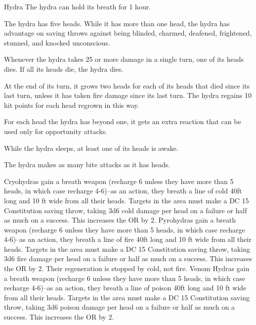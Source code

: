 \begin{DndMonster}{Hydra}
	\DndMonsterBasics[armor-class={16 (natural armor)}, hit-points={149 (13d12 + 65)}, speed={30 ft., swim 30 ft.}]
	\DndMonsterDetails[saving-throws={}, skills={Perception +6}, damage-immunities={}, damage-resistances={}, damage-vulnerabilities={}, condition-immunities={}, senses={darkvision 60 ft., passive Perception 16}, languages={—}, challenge={8:8}]
	 The hydra can hold its breath for 1 hour.
	
	 The hydra has five heads. While it has more than one head, the hydra has advantage on saving throws against being blinded, charmed, deafened, frightened, stunned, and knocked unconscious.
	
	Whenever the hydra takes 25 or more damage in a single turn, one of its heads dies. If all its heads die, the hydra dies.
	
	At the end of its turn, it grows two heads for each of its heads that died since its last turn, unless it has taken fire damage since its last turn. The hydra regains 10 hit points for each head regrown in this way.
	
	 For each head the hydra has beyond one, it gets an extra reaction that can be used only for opportunity attacks.
	
	 While the hydra sleeps, at least one of its heads is awake.
	
	 The hydra makes as many bite attacks as it has heads.
	\DndMonsterAttack[
		name=Bite,
		distance=melee,
		type=weapon,
		mod=+8,
		reach=10,
		dmg=\DndDice{1d10 + 5},
		dmg-type=piercing
	]

	 Cryohydras gain a breath weapon (recharge 6 unless they have more than 5 heads, in which case recharge 4-6)--as an action, they breath a line of cold 40ft long and 10 ft wide from all their heads. Targets in the area must make a DC 15 Constitution saving throw, taking 3d6 cold damage per head on a failure or half as much on a success. This increases the OR by 2.
	 Pyrohydras gain a breath weapon (recharge 6 unless they have more than 5 heads, in which case recharge 4-6)--as an action, they breath a line of fire 40ft long and 10 ft wide from all their heads. Targets in the area must make a DC 15 Constitution saving throw, taking 3d6 fire damage per head on a failure or half as much on a success. This increases the OR by 2. Their regeneration is stopped by cold, not fire.
	 Venom Hydras gain a breath weapon (recharge 6 unless they have more than 5 heads, in which case recharge 4-6)--as an action, they breath a line of poison 40ft long and 10 ft wide from all their heads. Targets in the area must make a DC 15 Constitution saving throw, taking 3d6 poison damage per head on a failure or half as much on a success. This increases the OR by 2.
\end{DndMonster}

